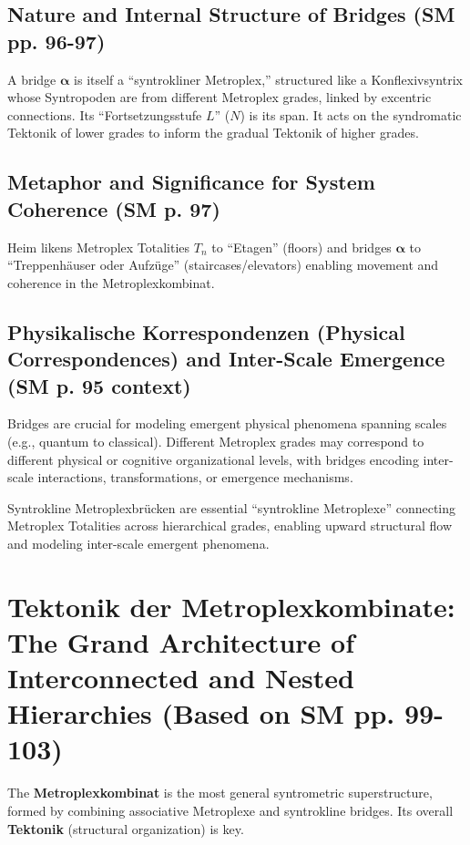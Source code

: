 \documentclass[
    12pt,              %
    a4paper,           %
    headings=normal,   %
    twoside=true,      %
    BCOR=8mm,          %
]{scrbook}
\newcommand{\q}[1]{\enquote{#1}}
\newcommand{\metroplextotalitaet}[1]{T_{#1}}
\begin{document}
\subsection{Nature and Internal Structure of Bridges (SM pp. 96-97)}
\label{sec:ch5_bridge_nature_structure}
A bridge \(\bm{\alpha}\) is itself a \q{syntrokliner Metroplex,} structured like a Konflexivsyntrix whose Syntropoden are from different Metroplex grades, linked by excentric connections. Its \q{Fortsetzungsstufe \(L\)} (\(N\)) is its span. It acts on the syndromatic Tektonik of lower grades to inform the gradual Tektonik of higher grades.

\subsection{Metaphor and Significance for System Coherence (SM p. 97)}
\label{sec:ch5_bridge_metaphor_significance}
Heim likens Metroplex Totalities \(\metroplextotalitaet{n}\) to \q{Etagen} (floors) and bridges \(\bm{\alpha}\) to \q{Treppenhäuser oder Aufzüge} (staircases/elevators) enabling movement and coherence in the Metroplexkombinat.

\subsection{Physikalische Korrespondenzen (Physical Correspondences) and Inter-Scale Emergence (SM p. 95 context)}
\label{sec:ch5_bridge_physical_correspondences}
Bridges are crucial for modeling emergent physical phenomena spanning scales (e.g., quantum to classical). Different Metroplex grades may correspond to different physical or cognitive organizational levels, with bridges encoding inter-scale interactions, transformations, or emergence mechanisms.

Syntrokline Metroplexbrücken are essential \q{syntrokline Metroplexe} connecting Metroplex Totalities across hierarchical grades, enabling upward structural flow and modeling inter-scale emergent phenomena.

\section{Tektonik der Metroplexkombinate: The Grand Architecture of Interconnected and Nested Hierarchies (Based on SM pp. 99-103)}
\label{sec:ch5_tektonik_metroplexkombinate}

The \textbf{Metroplexkombinat} is the most general syntrometric superstructure, formed by combining associative Metroplexe and syntrokline bridges. Its overall \textbf{Tektonik} (structural organization) is key.
\end{document}
